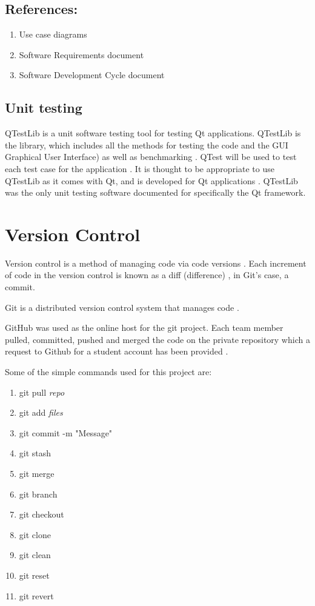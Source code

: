\documentclass{unitemplate}
\begin{document}
\subsection{References: }
\begin{enumerate}
\item Use case diagrams
\item Software Requirements document 
\item Software Development Cycle document
\end{enumerate}

\subsection{Unit testing}
QTestLib is a unit software testing tool for testing Qt applications. QTestLib is the library, which includes all the methods for testing the code and the GUI Graphical User Interface) as well as benchmarking \cite{qtestlib}. QTest will be used to test each test case for the application \cite{qtestlib}. It is thought to be appropriate to use QTestLib as it comes with Qt, and is developed for Qt applications \cite{qtestlib}. QTestLib was the only unit testing software documented for specifically the Qt framework.


%
%
%
%
%
%


\section{Version Control}
Version control is a method of managing code via code versions \cite{sommerville2007software}. Each increment of code in the version control is known as a diff (difference) \cite{sommerville2007software}, in Git's case, a commit.


%
%
%
%
%
%

Git is a distributed version control system that manages code \cite{gitabout}.

GitHub was used as the online host for the git project. Each team member pulled, committed, pushed and merged the code on the private repository which a request to Github for a student account has been provided \cite{githbprivacunt}.

Some of the simple commands used for this project are:
\begin{enumerate}
    \item git pull \emph{repo}
    \item git add \emph{files}
    \item git commit -m "Message"
    \item git stash
    \item git merge
    \item git branch
    \item git checkout
    \item git clone
    \item git clean
    \item git reset
    \item git revert
\end{enumerate}
\end{document}
